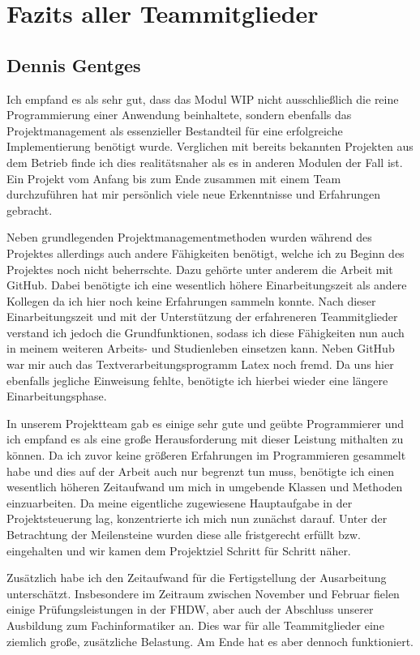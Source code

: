 \section{Fazits aller Teammitglieder}

\subsection{Dennis Gentges}
Ich empfand es als sehr gut, dass das Modul WIP nicht ausschließlich die reine Programmierung einer Anwendung beinhaltete, sondern ebenfalls das Projektmanagement als essenzieller Bestandteil für eine erfolgreiche Implementierung benötigt wurde. Verglichen mit bereits bekannten Projekten aus dem Betrieb finde ich dies realitätsnaher als es in anderen Modulen der Fall ist. Ein Projekt vom Anfang bis zum Ende zusammen mit einem Team durchzuführen hat mir persönlich viele neue Erkenntnisse und Erfahrungen gebracht.

Neben grundlegenden Projektmanagementmethoden wurden während des Projektes allerdings auch andere Fähigkeiten benötigt, welche ich zu Beginn des Projektes noch nicht beherrschte. Dazu gehörte unter anderem die Arbeit mit GitHub. Dabei benötigte ich eine wesentlich höhere Einarbeitungszeit als andere Kollegen da ich hier noch keine Erfahrungen sammeln konnte. Nach dieser Einarbeitungszeit und mit der Unterstützung der erfahreneren Teammitglieder verstand ich jedoch die Grundfunktionen, sodass ich diese Fähigkeiten nun auch in meinem weiteren Arbeits- und Studienleben einsetzen kann. 
Neben GitHub war mir auch das Textverarbeitungsprogramm Latex noch fremd. Da uns hier ebenfalls jegliche Einweisung fehlte, benötigte ich hierbei wieder eine längere Einarbeitungsphase.

In unserem Projektteam gab es einige sehr gute und geübte Programmierer und ich empfand es als eine große Herausforderung mit dieser Leistung mithalten zu können. Da ich zuvor keine größeren Erfahrungen im Programmieren gesammelt habe und dies auf der Arbeit auch nur begrenzt tun muss, benötigte ich einen wesentlich höheren Zeitaufwand um mich in umgebende Klassen und Methoden einzuarbeiten. Da meine eigentliche zugewiesene Hauptaufgabe in der Projektsteuerung lag, konzentrierte ich mich nun zunächst darauf. Unter der Betrachtung der Meilensteine wurden diese alle fristgerecht erfüllt bzw. eingehalten und wir kamen dem Projektziel Schritt für Schritt näher.

Zusätzlich habe ich den Zeitaufwand für die Fertigstellung der Ausarbeitung unterschätzt. Insbesondere im Zeitraum zwischen November und Februar fielen einige Prüfungsleistungen in der FHDW, aber auch der Abschluss unserer Ausbildung zum Fachinformatiker an. Dies war für alle Teammitglieder eine ziemlich große, zusätzliche Belastung. Am Ende hat es aber dennoch funktioniert.

